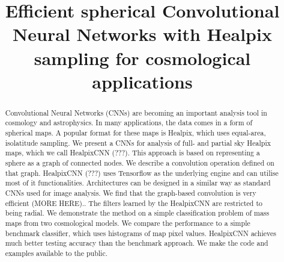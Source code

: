\documentclass[final,twocolumn,3p,times,authoryear]{elsarticle}
\newcommand{\1}{\b{1}}              %
\newcommand{\0}{\b{0}}              %
\begin{document}
\begin{frontmatter}



\title{Efficient spherical Convolutional Neural Networks with Healpix sampling for cosmological applications}


\author{}

\address{}

\begin{abstract}

Convolutional Neural Networks (CNNs) are becoming an important analysis tool in cosmology and astrophysics.
In many applications, the data comes in a form of spherical maps.
A popular format for these maps is Healpix, which uses equal-area, isolatitude sampling.
We present a CNNs for analysis of full- and partial sky Healpix maps, which we call HealpixCNN (???).
This approach is based on representing a sphere as a graph of connected nodes.
We describe a convolution operation defined on that graph.
HealpixCNN (???) uses Tensorflow as the underlying engine and can utilise most of it functionalities.
Architectures can be designed in a similar way as standard CNNs used for image analysis.
We find that the graph-based convolution is very efficient (MORE HERE)..
The filters learned by the HealpixCNN are restricted to being radial.
We demonstrate the method on a simple classification problem of mass maps from two cosmological models.
We compare the performance to a simple benchmark classifier, which uses histograms of map pixel values.
HealpixCNN achieves much better testing accuracy than the benchmark approach.
We make the code and examples available to the public.


\end{abstract}
\end{frontmatter}
\end{document}
